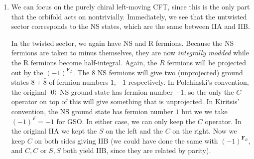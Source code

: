 \documentclass[11pt, class=article, crop=false]{standalone}
\begin{document}
\begin{enumerate}
	In the R sector, the massless states come from the bosonic ND ground state combining with one of the 4 NN R sector states giving an $\SO(5,1)$ spinor. After GSO projection, this gives a chirality $+$ fermion, completing the hypermultiplet.
	\textbf{This part is a bit shifty, thing about it}
	
	Each of these states has 32 labels from the D9 brane, and 2N labels from the D5 brane. Therefore, we get that this hypermultiplet in fact transforms in the $(2N, 32)$ bi-fundamental. Again, orientation projection simply restricts us to not have a second copy of this spectrum from 5-9 strings of opposite orientation.
	
	Say we pull apart $m$ D5 branes (each D5 brane is already a symplectic pair of half-branes, so any $m$ is allowed). The 5-9 strings stretching to the displaced branes now have positive zero-point energy and will not contribute to the massless spectrum, while those ending on the remaining stack still give the massless $(2(N-m), 32)$ hypermultiplet. The 5-5 strings remain the same, but transforming in $\Sp(2N - 2m) \times \Sp(2m)$ instead of $\Sp(2N)$.
 	
	
	\item We can focus on the purely chiral left-moving CFT, since this is the only part that the orbifold acts on nontrivially. Immediately, we see that the untwisted sector corresponds to the NS states, which are the same between IIA and IIB. 
	
	In the twisted sector, we again have NS and R fermions. Because the NS fermions are taken to minus themselves, they are now \emph{integrally modded} while the R fermions become half-integral. Again, the $R$ fermions will be projected out by the $(-1)^{\mathbf{F}_L}$. The $8$ NS fermions will give two (unprojected) ground states $8 + \bar 8$ of fermion numbers $1, -1$ respectively. In Polchinski's convention, the original $\ket{0}$ NS ground state has fermion number $-1$, so the only the $C$ operator on top of this will give something that is unprojected. In Kiritsis' convention, the NS ground state has fermion number $1$ but we we take $(-1)^F = -1$ for GSO. In either case, we can only keep the $C$ operator. In the original IIA we kept the $S$ on the left and the $C$ on the right. Now we keep $C$ on both sides giving IIB (we could have done the same with $(-1)^{\mathbf{F}_R}$, and $C,C$ or $S,S$ both yield IIB, since they are related by parity).
	

\end{enumerate}
\end{document}
